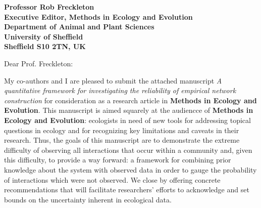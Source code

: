 \documentclass[12pt]{letter}
\begin{document}
\begin{letter}{\bf Professor Rob Freckleton\\
               Executive Editor, Methods in Ecology and Evolution\\
               Department of Animal and Plant Sciences\\
               University of Sheffield\\
               Sheffield S10 2TN, UK
                               }


\opening{Dear Prof. Freckleton:}

    My co-authors and I are pleased to submit the attached manuscript \emph{A quantitative framework for investigating the reliability of empirical network construction} for consideration as a research article in \textbf{Methods in Ecology and Evolution}. This manuscript is aimed squarely at the audiencce of \textbf{Methods in Ecology and Evolution}: ecologists in need of new tools for addressing topical questions in ecology and for recognizing key limitations and caveats in their research. Thus, the goals of this manuscript are to demonstrate the extreme difficulty of observing all interactions that occur within a community and, given this difficulty, to provide a way forward: a framework for combining prior knowledge about the system with observed data in order to gauge the probability of interactions which were not observed. We close by offering concrete recommendations that will facilitate researchers' efforts to acknowledge and set bounds on the uncertainty inherent in ecological data.





\end{letter}
\end{document}
